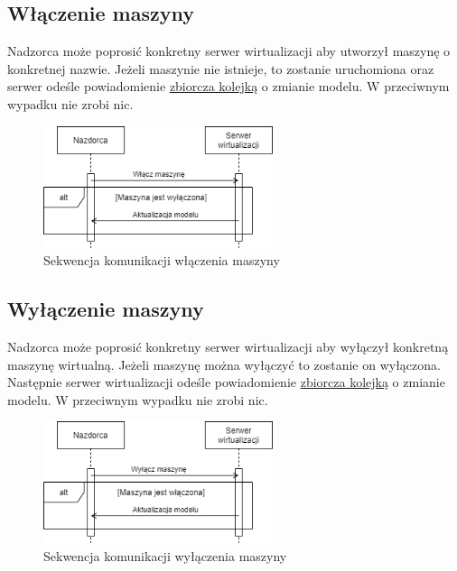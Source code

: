 \documentclass[../opis-rozwiazania.tex]{subfiles}
\begin{document}
\subsection{Włączenie maszyny}

Nadzorca może poprosić konkretny serwer wirtualizacji aby utworzył maszynę o konkretnej nazwie.
Jeżeli maszynie nie istnieje, to zostanie uruchomiona oraz serwer odeśle powiadomienie \hyperref[modules:broker:queue-overseers]{zbiorcza kolejką} o zmianie modelu.
W przeciwnym wypadku nie zrobi nic.

\begin{figure}[H]
    \centering
    \includegraphics[width=0.6\textwidth]{../diagrams/sequence_diagrams/wlaczenie_maszyny.png}
    \caption{Sekwencja komunikacji włączenia maszyny}
    \label{figure:diagrams:sequence_diagrams:wlaczenie_maszyny}
\end{figure}

\subsection{Wyłączenie maszyny}

Nadzorca może poprosić konkretny serwer wirtualizacji aby wyłączył konkretną maszynę wirtualną.
Jeżeli maszynę można wyłączyć to zostanie on wyłączona.
Następnie serwer wirtualizacji odeśle powiadomienie \hyperref[modules:broker:queue-overseers]{zbiorcza kolejką} o zmianie modelu.
W przeciwnym wypadku nie zrobi nic.

\begin{figure}[H]
    \centering
    \includegraphics[width=0.6\textwidth]{../diagrams/sequence_diagrams/wylaczenie_maszyny.png}
    \caption{Sekwencja komunikacji wyłączenia maszyny}
    \label{figure:diagrams:sequence_diagrams:wylaczenie_maszyny}
\end{figure}
\end{document}
